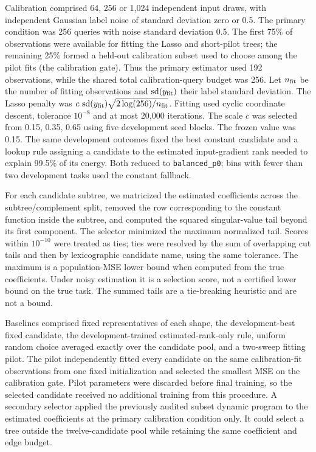 Calibration comprised 64, 256 or 1,024 independent input draws, with independent Gaussian label noise of standard deviation zero or 0.5. The primary condition was 256 queries with noise standard deviation 0.5. The first 75\% of observations were available for fitting the Lasso and short-pilot trees; the remaining 25\% formed a held-out calibration subset used to choose among the pilot fits (the calibration gate). Thus the primary estimator used 192 observations, while the shared total calibration-query budget was 256. Let $n_{\rm fit}$ be the number of fitting observations and $\operatorname{sd}(y_{\rm fit})$ their label standard deviation. The Lasso penalty was $c\,\operatorname{sd}(y_{\rm fit})\sqrt{2\log(256)/n_{\rm fit}}$. Fitting used cyclic coordinate descent, tolerance $10^{-8}$ and at most 20,000 iterations. The scale $c$ was selected from 0.15, 0.35, 0.65 using five development seed blocks. The frozen value was 0.15. The same development outcomes fixed the best constant candidate and a lookup rule assigning a candidate to the estimated input-gradient rank needed to explain 99.5\% of its energy. Both reduced to \texttt{balanced\_p0}; bins with fewer than two development tasks used the constant fallback.

For each candidate subtree, we matricized the estimated coefficients across the subtree/complement split, removed the row corresponding to the constant function inside the subtree, and computed the squared singular-value tail beyond its first component. The selector minimized the maximum normalized tail. Scores within $10^{-10}$ were treated as ties; ties were resolved by the sum of overlapping cut tails and then by lexicographic candidate name, using the same tolerance. The maximum is a population-MSE lower bound when computed from the true coefficients. Under noisy estimation it is a selection score, not a certified lower bound on the true task. The summed tails are a tie-breaking heuristic and are not a bound.

Baselines comprised fixed representatives of each shape, the development-best fixed candidate, the development-trained estimated-rank-only rule, uniform random choice averaged exactly over the candidate pool, and a two-sweep fitting pilot. The pilot independently fitted every candidate on the same calibration-fit observations from one fixed initialization and selected the smallest MSE on the calibration gate. Pilot parameters were discarded before final training, so the selected candidate received no additional training from this procedure. A secondary selector applied the previously audited subset dynamic program to the estimated coefficients at the primary calibration condition only. It could select a tree outside the twelve-candidate pool while retaining the same coefficient and edge budget.

